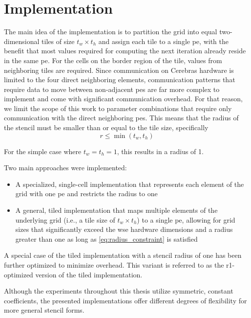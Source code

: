 \chapter{Implementation}
\label{sec:implementation}
The main idea of the implementation is to partition the grid into equal two-dimensional tiles of size $t_w \times t_h$ and assign each tile to a single \ac{pe}, with the benefit that most values required for computing the next iteration already reside in the same \ac{pe}. For the cells on the border region of the tile, values from neighboring tiles are required. Since communication on Cerebras hardware is limited to the four direct neighboring elements, communication patterns that require data to move between non-adjacent \acp{pe} are far more complex to implement and come with significant communication overhead. For that reason, we limit the scope of this work to parameter combinations that require only communication with the direct neighboring \acp{pe}. This means that the radius of the stencil must be smaller than or equal to the tile size, specifically
\begin{equation}    
\label{eq:radius_constraint}
r \leq \min(t_w, t_h)
\end{equation}

For the simple case where $t_w=t_h=1$, this results in a radius of 1.

Two main approaches were implemented:
\begin{itemize}
    \item A specialized, single-cell implementation that represents each element of the grid with one \ac{pe} and restricts the radius to one
    \item A general, tiled implementation that maps multiple elements of the underlying grid (i.e., a tile size of $t_w \times t_h$) to a single \ac{pe}, allowing for grid sizes that significantly exceed the \ac{wse} hardware dimensions and a radius greater than one as long as \autoref{eq:radius_constraint} is satisfied 
\end{itemize}

A special case of the tiled implementation with a stencil radius of one has been further optimized to minimize overhead. This variant is referred to as the r1-optimized version of the tiled implementation.

Although the experiments throughout this thesis utilize symmetric, constant coefficients, the presented implementations offer different degrees of flexibility for more general stencil forms.

